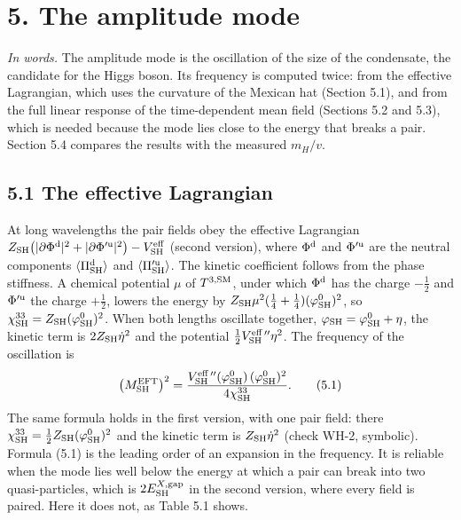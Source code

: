 \documentclass[
  10pt,
]{article}
\begin{document}
\hypertarget{the-amplitude-mode}{%
\section{5. The amplitude mode}\label{the-amplitude-mode}}

\emph{In words.} The amplitude mode is the oscillation of the size of
the condensate, the candidate for the Higgs boson. Its frequency is
computed twice: from the effective Lagrangian, which uses the curvature
of the Mexican hat (Section 5.1), and from the full linear response of
the time-dependent mean field (Sections 5.2 and 5.3), which is needed
because the mode lies close to the energy that breaks a pair. Section
5.4 compares the results with the measured \(m_H/v\).

\hypertarget{the-effective-lagrangian}{%
\subsection{5.1 The effective
Lagrangian}\label{the-effective-lagrangian}}

At long wavelengths the pair fields obey the effective Lagrangian
\(Z_{\rm SH}\big(\lvert\partial\Phi^{\rm d}\rvert^2+\lvert\partial\Phi'^{\rm u}\rvert^2\big)-V^{\rm eff}_{\rm SH}\)
(second version), where \(\Phi^{\rm d}\) and \(\Phi'^{\rm u}\) are the
neutral components \(\langle\Pi^{\rm d}_{\rm SH}\rangle\) and
\(\langle\Pi'^{\rm u}_{\rm SH}\rangle\). The kinetic coefficient follows
from the phase stiffness. A chemical potential \(\mu\) of
\(T^{3,{\rm SM}}\), under which \(\Phi^{\rm d}\) has the charge
\(-\tfrac12\) and \(\Phi'^{\rm u}\) the charge \(+\tfrac12\), lowers the
energy by \(Z_{\rm SH}\mu^2(\tfrac14+\tfrac14)(\varphi^0_{\rm SH})^2\),
so \(\chi^{33}_{\rm SH}=Z_{\rm SH}(\varphi^0_{\rm SH})^2\). When both
lengths oscillate together,
\(\varphi_{\rm SH}=\varphi^0_{\rm SH}+\eta\), the kinetic term is
\(2Z_{\rm SH}\dot\eta^2\) and the potential
\(\tfrac12V^{\rm eff\,\prime\prime}_{\rm SH}\eta^2\). The frequency of
the oscillation is
\[\big(M^{\rm EFT}_{\rm SH}\big)^2=\frac{V^{\rm eff\,\prime\prime}_{\rm SH}(\varphi^0_{\rm SH})\,(\varphi^0_{\rm SH})^2}{4\chi^{33}_{\rm SH}}.\tag{5.1}\]
The same formula holds in the first version, with one pair field: there
\(\chi^{33}_{\rm SH}=\tfrac12Z_{\rm SH}(\varphi^0_{\rm SH})^2\) and the
kinetic term is \(Z_{\rm SH}\dot\eta^2\) (check WH-2, symbolic). Formula
(5.1) is the leading order of an expansion in the frequency. It is
reliable when the mode lies well below the energy at which a pair can
break into two quasi-particles, which is \(2E^{X,{\rm gap}}_{\rm SH}\)
in the second version, where every field is paired. Here it does not, as
Table 5.1 shows.
\end{document}
